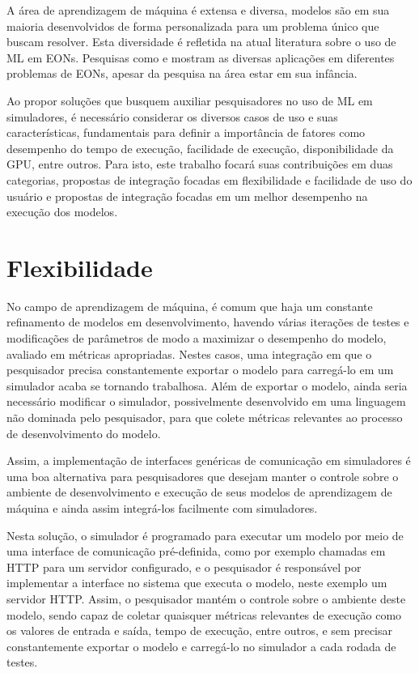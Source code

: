 A área de aprendizagem de máquina é extensa e diversa, modelos são em sua maioria desenvolvidos de forma personalizada para um problema único que buscam resolver. Esta diversidade é refletida na atual literatura sobre o uso de ML em EONs. Pesquisas como \cite{eon_ml_survey_2020} e \cite{8527529} mostram as diversas aplicações em diferentes problemas de EONs, apesar da pesquisa na área estar em sua infância.

Ao propor soluções que busquem auxiliar pesquisadores no uso de ML em simuladores, é necessário considerar os diversos casos de uso e suas características, fundamentais para definir a importância de fatores como desempenho do tempo de execução, facilidade de execução, disponibilidade da GPU, entre outros. Para isto, este trabalho focará suas contribuições em duas categorias, propostas de integração focadas em flexibilidade e facilidade de uso do usuário e propostas de integração focadas em um melhor desempenho na execução dos modelos.

\section{Flexibilidade}
\label{flexible}

No campo de aprendizagem de máquina, é comum que haja um constante refinamento de modelos em desenvolvimento, havendo várias iterações de testes e modificações de parâmetros de modo a maximizar o desempenho do modelo, avaliado em métricas apropriadas. Nestes casos, uma integração em que o pesquisador precisa constantemente exportar o modelo para carregá-lo em um simulador acaba se tornando trabalhosa. Além de exportar o modelo, ainda seria necessário modificar o simulador, possivelmente desenvolvido em uma linguagem não dominada pelo pesquisador, para que colete métricas relevantes ao processo de desenvolvimento do modelo.

Assim, a implementação de interfaces genéricas de comunicação em simuladores é uma boa alternativa para pesquisadores que desejam manter o controle sobre o ambiente de desenvolvimento e execução de seus modelos de aprendizagem de máquina e ainda assim integrá-los facilmente com simuladores.

Nesta solução, o simulador é programado para executar um modelo por meio de uma interface de comunicação pré-definida, como por exemplo chamadas em HTTP para um servidor configurado, e o pesquisador é responsável por implementar a interface no sistema que executa o modelo, neste exemplo um servidor HTTP. Assim, o pesquisador mantém o controle sobre o ambiente deste modelo, sendo capaz de coletar quaisquer métricas relevantes de execução como os valores de entrada e saída, tempo de execução, entre outros, e sem precisar constantemente exportar o modelo e carregá-lo no simulador a cada rodada de testes.

